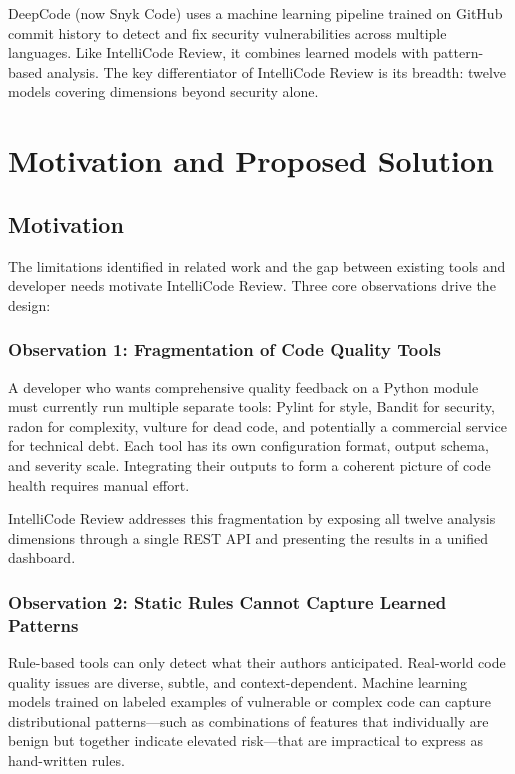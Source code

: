 \documentclass[12pt, oneside]{report}
\begin{document}
DeepCode (now Snyk Code) uses a machine learning pipeline trained on GitHub commit history
to detect and fix security vulnerabilities across multiple languages. Like IntelliCode
Review, it combines learned models with pattern-based analysis. The key differentiator of
IntelliCode Review is its breadth: twelve models covering dimensions beyond security alone.

\chapter{Motivation and Proposed Solution}
\label{ch:motivation}

\section{Motivation}
\label{sec:motivation}

The limitations identified in related work and the gap between existing tools and developer
needs motivate IntelliCode Review. Three core observations drive the design:

\subsection{Observation 1: Fragmentation of Code Quality Tools}

A developer who wants comprehensive quality feedback on a Python module must currently
run multiple separate tools: Pylint for style, Bandit for security, radon for complexity,
vulture for dead code, and potentially a commercial service for technical debt. Each
tool has its own configuration format, output schema, and severity scale. Integrating
their outputs to form a coherent picture of code health requires manual effort.

IntelliCode Review addresses this fragmentation by exposing all twelve analysis dimensions
through a single REST API and presenting the results in a unified dashboard.

\subsection{Observation 2: Static Rules Cannot Capture Learned Patterns}

Rule-based tools can only detect what their authors anticipated. Real-world code quality
issues are diverse, subtle, and context-dependent. Machine learning models trained on
labeled examples of vulnerable or complex code can capture distributional patterns---such
as combinations of features that individually are benign but together indicate elevated
risk---that are impractical to express as hand-written rules.
\end{document}
